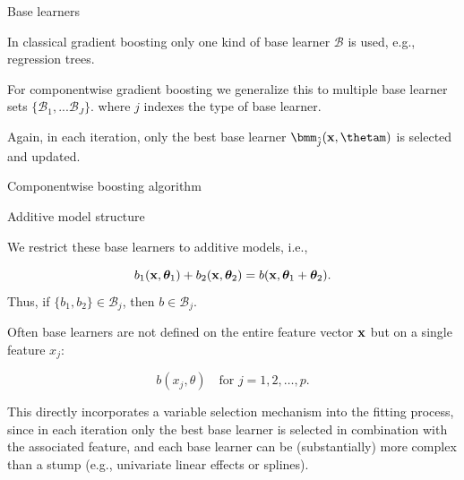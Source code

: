 
\begin{vbframe}{Base learners}

In classical gradient boosting only one kind of base learner $\mathcal{B}$ is used, e.g., 
regression trees.

\lz

For componentwise gradient boosting we generalize this to multiple base learner sets $\{ \mathcal{B}_1, ... \mathcal{B}_J \}$.
% 
 where $j$ indexes the type of base learner.
% 

Again, in each iteration, only the best base learner 
$\bmm_{\hat{j}}(\xv, \thetam)$ is selected and updated.

\end{vbframe}

\begin{vbframe}{Componentwise boosting algorithm}



\end{vbframe}
\begin{vbframe}{Additive model structure}

We restrict these base learners to additive models, i.e.,

$$
 b_1(\mathbf{x}, \bm{\theta}_1) + b_2(\mathbf{x}, \bm{\theta}_2) = 
 b(\mathbf{x}, \bm{\theta}_1 + \bm{\theta}_2).
$$
Thus, if $\{ b_1, b_2 \} \in \mathcal{B}_j$, then $b \in \mathcal{B}_j$.
\lz

Often base learners are not defined on the entire feature vector $\mathbf{x}$ but on 
a single feature $x_j$:

$$
  b(x_j, \theta) \quad \text{for } j = 1, 2, \dots, p.
$$

\lz
This directly incorporates a variable selection mechanism into the fitting 
process, since in each iteration only the best base learner is selected in 
combination with the associated feature, and each base learner can be 
(substantially) more complex than a stump (e.g., univariate linear effects or 
splines).

\end{vbframe}



